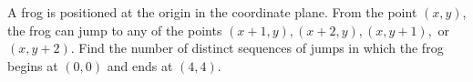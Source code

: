 A frog is positioned at the origin in the coordinate plane. From the point $(x,y)$,  the frog can jump to any of the points $(x+1, y), (x+2, y), (x, y+1),$ or $(x, y+2)$. Find the number of distinct sequences of jumps in which the frog begins at $(0,0)$ and ends at $(4,4)$.
